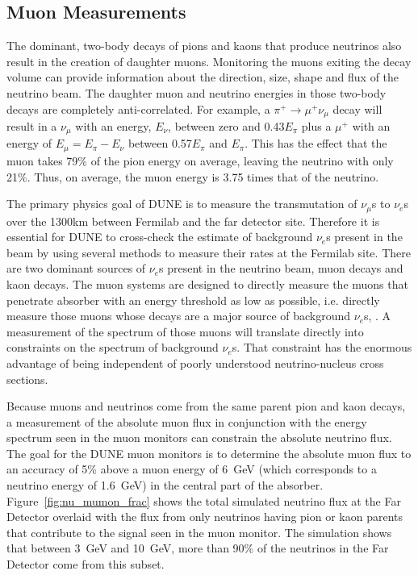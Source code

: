 \subsection{Muon Measurements}
\label{subsec:nd-blm-muon-meas}
The dominant, two-body decays of pions and kaons that produce
neutrinos also result in the creation of daughter muons. Monitoring
the muons exiting the decay volume can provide information about the
direction, size, shape and flux of the neutrino beam.  The daughter
muon and neutrino energies in those two-body decays are completely
anti-correlated. For example, a $\pi^+\rightarrow \mu^+\nu_\mu$
decay will result in a $\nu_\mu$ with an energy, $E_\nu$, between
zero and 0.43$E_\pi$ plus a $\mu^+$ with an energy of 
$E_\mu=E_\pi-E_\nu$ between 0.57$E_\pi$ and $E_\pi$. This has the
effect that the muon takes 79\% of the pion energy on average,  
leaving the neutrino with only  21\%. Thus, on average, the
muon energy is 3.75 times that of the neutrino.

The primary physics goal of DUNE is to measure the transmutation
of $\nu_\mu$s to $\nu_e$s over the 1300km between Fermilab
and the far detector site.
Therefore it is essential for DUNE to cross-check the estimate of 
background $\nu_e$s present in the beam by using several
methods to measure their rates at the Fermilab site. 
There are two dominant sources of $\nu_e$s present in the
neutrino beam, muon decays and kaon decays. 
The muon systems are designed to directly measure the 
muons that penetrate absorber with an energy 
threshold as low as possible, i.e. directly measure those muons 
whose decays are a major source of background $\nu_e$s, . 
A measurement of the spectrum of those muons will translate
 directly into constraints on the spectrum of background $\nu_e$s.
That constraint has the enormous advantage of being independent of poorly understood 
neutrino-nucleus cross sections.

Because muons and neutrinos come from the same parent pion and kaon
decays, a measurement of the absolute muon flux in conjunction with the energy spectrum
seen in the muon monitors can constrain the absolute neutrino flux.  
The goal for the DUNE muon monitors is to determine the absolute muon flux
to an accuracy of 5\% above a muon energy of 6~GeV (which corresponds to
a neutrino energy of 1.6~GeV) in the central part of the absorber.
Figure~\ref{fig:nu_mumon_frac} shows the total simulated neutrino flux at the 
Far Detector overlaid with the flux from only neutrinos having pion or kaon parents that contribute to the signal
seen in the muon monitor.  The simulation shows that between 3~GeV and 10~GeV, more than 90\% of 
the neutrinos in the Far Detector come from this subset.

